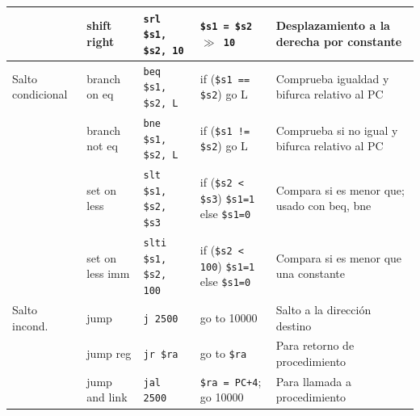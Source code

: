 \documentclass[12pt,a4paper]{article}
\begin{document}
\begin{xltabular}{\textwidth}{>{\raggedright\arraybackslash}p{2.2cm} | >{\raggedright\arraybackslash}p{2.2cm} | >{\raggedright\arraybackslash}p{3cm} | >{\raggedright\arraybackslash}p{3.5cm} X}
		& shift right & \texttt{srl \$s1, \$s2, 10} & \texttt{\$s1 = \$s2 $\gg$ 10} & Desplazamiento a la derecha por constante \\
		\midrule 
		Salto condicional 
		& branch on eq & \texttt{beq \$s1, \$s2, L} & if (\texttt{\$s1 == \$s2}) go L & Comprueba igualdad y bifurca relativo al PC \\ 
		& branch not eq & \texttt{bne \$s1, \$s2, L} & if (\texttt{\$s1 != \$s2}) go L & Comprueba si no igual y bifurca relativo al PC \\ 
		& set on less & \texttt{slt \$s1, \$s2, \$s3} & if (\texttt{\$s2 < \$s3}) \texttt{\$s1=1} else \texttt{\$s1=0} & Compara si es menor que; usado con beq, bne \\ 
		& set on less imm & \texttt{slti \$s1, \$s2, 100}& if (\texttt{\$s2 < 100}) \texttt{\$s1=1} else \texttt{\$s1=0} & Compara si es menor que una constante \\
		\midrule 
		Salto incond. 
		& jump & \texttt{j 2500} & go to 10000 & Salto a la dirección destino \\ 
		& jump reg & \texttt{jr \$ra} & go to \texttt{\$ra} & Para retorno de procedimiento \\ 
		& jump and link & \texttt{jal 2500} & \texttt{\$ra = PC+4}; go 10000 & Para llamada a procedimiento \\
	\end{xltabular}
	
\end{document}
